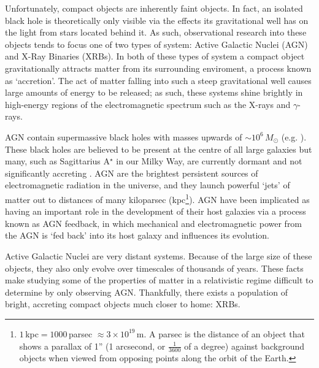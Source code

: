 \par Unfortunately, compact objects are inherently faint objects.  In fact, an isolated black hole is theoretically only visible via the effects its gravitational well has on the light from stars located behind it.  As such, observational research into these objects tends to focus one of two types of system: Active Galactic Nuclei (AGN) and X-Ray Binaries (XRBs).  In both of these types of system a compact object gravitationally attracts matter from its surrounding enviroment, a process known as `accretion'.  The act of matter falling into such a steep gravitational well causes large amounts of energy to be released; as such, these systems shine brightly in high-energy regions of the electromagnetic spectrum such as the X-rays and $\gamma$-rays.
\par AGN contain supermassive black holes with masses upwards of $\sim10^6$\,$M_\odot$ (e.g. \citealp{Miyoshi_SMBH}).  These black holes are believed to be present at the centre of all large galaxies but many, such as Sagittarius A$^\star$ in our Milky Way, are currently dormant and not significantly accreting \citep{LyndenBell_Quasar,Schodel_SagA}.  AGN are the brightest persistent sources of electromagnetic radiation in the universe, and they launch powerful `jets' of matter out to distances of many kiloparsec (kpc\footnote{$1$\,kpc$ =1000$\,parsec $\approx3\times10^{19}$\,m.  A parsec is the distance of an object that shows a parallax of 1'' (1 arcsecond, or $\frac{1}{3600}$ of a degree) against background objects when viewed from opposing points along the orbit of the Earth.}).  AGN have been implicated as having an important role in the development of their host galaxies via a process known as AGN feedback, in which mechanical and electromagnetic power from the AGN is `fed back' into its host galaxy and influences its evolution.
\par Active Galactic Nuclei are very distant systems.  Because of the large size of these objects, they also only evolve over timescales of thousands of years.  These facts make studying some of the properties of matter in a relativistic regime difficult to determine by only observing AGN.  Thankfully, there exists a population of bright, accreting compact objects much closer to home: XRBs.

